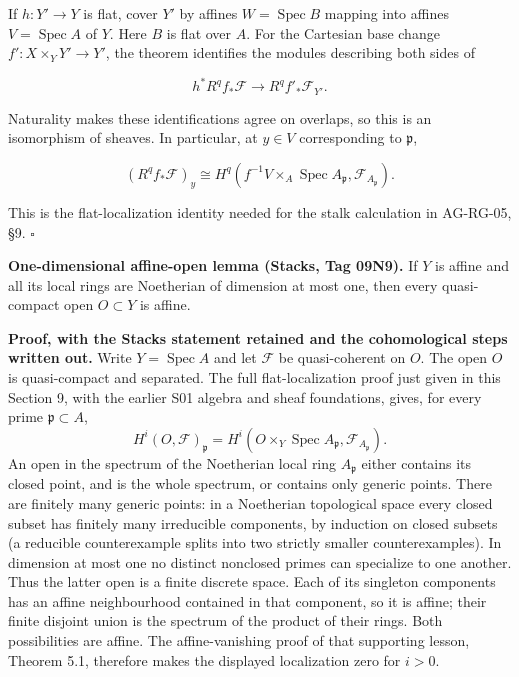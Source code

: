 \documentclass[11pt,a4paper,openany]{report}
\begin{document}
If \(h:Y'\to Y\) is flat, cover \(Y'\) by affines \(W=\operatorname{Spec}B\) mapping into affines \(V=\operatorname{Spec}A\) of \(Y\). Here \(B\) is flat over \(A\). For the Cartesian base change \(f':X\times_Y Y'\to Y'\), the theorem identifies the modules describing both sides of

\[
h^*R^qf_*\mathcal F\longrightarrow R^qf'_*\mathcal F_{Y'}.
\]

Naturality makes these identifications agree on overlaps, so this is an isomorphism of sheaves. In particular, at \(y\in V\) corresponding to \(\mathfrak p\),

\[
(R^qf_*\mathcal F)_y\cong
H^q(f^{-1}V\times_A\operatorname{Spec}A_{\mathfrak p},\mathcal F_{A_{\mathfrak p}}).
\]

This is the flat-localization identity needed for the stalk calculation in AG-RG-05, §9. \(\square\)

\textbf{One-dimensional affine-open lemma (Stacks, Tag 09N9).} If \(Y\) is affine and all its local rings are Noetherian of dimension at most one, then every quasi-compact open \(O\subset Y\) is affine.

\textbf{Proof, with the Stacks statement retained and the cohomological steps written out.} Write \(Y=\operatorname{Spec}A\) and let \(\mathcal F\) be quasi-coherent on \(O\). The open \(O\) is quasi-compact and separated. The full flat-localization proof just given in this Section 9, with the earlier S01 algebra and sheaf foundations, gives, for every prime \(\mathfrak p\subset A\), \[
H^i(O,\mathcal F)_{\mathfrak p}
=H^i(O\times_Y\operatorname{Spec}A_{\mathfrak p},\mathcal F_{A_{\mathfrak p}}).
\] An open in the spectrum of the Noetherian local ring \(A_{\mathfrak p}\) either contains its closed point, and is the whole spectrum, or contains only generic points. There are finitely many generic points: in a Noetherian topological space every closed subset has finitely many irreducible components, by induction on closed subsets (a reducible counterexample splits into two strictly smaller counterexamples). In dimension at most one no distinct nonclosed primes can specialize to one another. Thus the latter open is a finite discrete space. Each of its singleton components has an affine neighbourhood contained in that component, so it is affine; their finite disjoint union is the spectrum of the product of their rings. Both possibilities are affine. The affine-vanishing proof of that supporting lesson, Theorem 5.1, therefore makes the displayed localization zero for \(i>0\).
\end{document}
